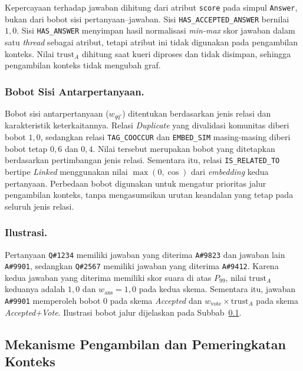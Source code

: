 Kepercayaan terhadap jawaban dihitung dari atribut \texttt{score} pada simpul \texttt{Answer}, bukan dari bobot sisi pertanyaan--jawaban. Sisi \texttt{HAS\_ACCEPTED\_ANSWER} bernilai $1{,}0$. Sisi \texttt{HAS\_ANSWER} menyimpan hasil normalisasi \emph{min-max} skor jawaban dalam satu \emph{thread} sebagai atribut, tetapi atribut ini tidak digunakan pada pengambilan konteks. Nilai $\mathrm{trust}_A$ dihitung saat kueri diproses dan tidak disimpan, sehingga pengambilan konteks tidak mengubah graf.

\subsubsection{Bobot Sisi Antarpertanyaan.}
Bobot sisi antarpertanyaan ($w_{qq'}$) ditentukan berdasarkan jenis relasi dan karakteristik keterkaitannya. Relasi \emph{Duplicate} yang divalidasi komunitas diberi bobot $1{,}0$, sedangkan relasi \texttt{TAG\_COOCCUR} dan \texttt{EMBED\_SIM} masing-masing diberi bobot tetap $0{,}6$ dan $0{,}4$. Nilai tersebut merupakan bobot yang ditetapkan berdasarkan pertimbangan jenis relasi. Sementara itu, relasi \texttt{IS\_RELATED\_TO} bertipe \emph{Linked} menggunakan nilai $\max(0,\cos)$ dari \emph{embedding} kedua pertanyaan. Perbedaan bobot digunakan untuk mengatur prioritas jalur pengambilan konteks, tanpa mengasumsikan urutan keandalan yang tetap pada seluruh jenis relasi.

\subsubsection{Ilustrasi.}
Pertanyaan \texttt{Q\#1234} memiliki jawaban yang diterima \texttt{A\#9823} dan jawaban lain \texttt{A\#9901}, sedangkan \texttt{Q\#2567} memiliki jawaban yang diterima \texttt{A\#9412}. Karena kedua jawaban yang diterima memiliki skor suara di atas $P_{99}$, nilai $\mathrm{trust}_A$ keduanya adalah $1{,}0$ dan $w_{\mathrm{ans}}=1{,}0$ pada kedua skema. Sementara itu, jawaban \texttt{A\#9901} memperoleh bobot 0 pada skema \emph{Accepted} dan $w_{\mathrm{vote}}\times\mathrm{trust}_A$ pada skema \emph{Accepted+Vote}. Ilustrasi bobot jalur dijelaskan pada Subbab~\ref{subsec:pengambilan-konteks}.

\subsection{Mekanisme Pengambilan dan Pemeringkatan Konteks}
\label{subsec:pengambilan-konteks}

